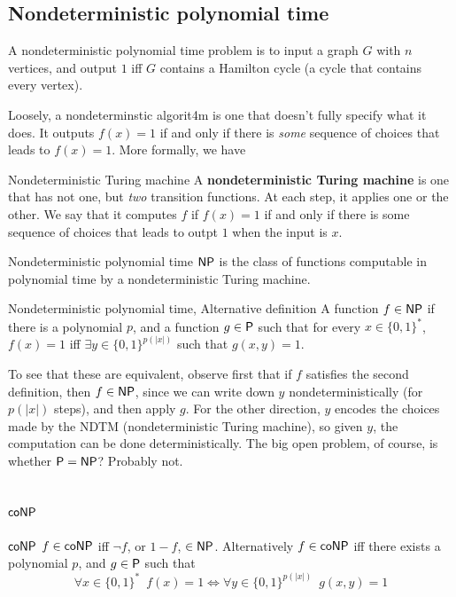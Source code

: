 \documentclass{article}
\begin{document}
\subsection{Nondeterministic polynomial time}
\begin{ex*}
    A nondeterministic polynomial time problem is to input a graph $G$ with $n$ vertices, and output $1$ iff $G$ contains a Hamilton cycle (a cycle that contains every vertex).
\end{ex*}
Loosely, a nondeterminstic algorit4m is one that doesn't fully specify what it does. It outputs $f(x)=1$ if and only if there is \textit{some} sequence of choices that leads to $f(x)=1$.\gap 
More formally, we have 
\begin{fancydefine}{Nondeterministic Turing machine}
    A \textbf{nondeterministic Turing machine} is one that has not one, but \textit{two} transition functions. At each step, it applies one or the other. \gap We say that it computes $f$ if $f(x)=1$ if and only if there is some sequence of choices that leads to outpt $1$ when the input is $x$.
\end{fancydefine}
\begin{fancydefine}{Nondeterministic polynomial time}
    $\mathsf{NP}$ is the class of functions computable in polynomial time by a nondeterministic Turing machine.
\end{fancydefine}
\begin{fancydefine*}{Nondeterministic polynomial time, Alternative definition}
    A function $f \in \mathsf{NP}$ if there is a polynomial $p$, and a function $g \in \mathsf{P}$ such that for every $x \in \{0,1\}^{*}$, $f(x)=1$ iff $\exists y \in \{0,1\}^{p(|x|)}$ such that $g(x,y)=1$.
\end{fancydefine*}
To see that these are equivalent, observe first that if $f$ satisfies the second definition, then $f \in \mathsf{NP}$, since we can write down $y$ nondeterministically (for $p(|x|)$ steps), and then apply $g$. \gap For the other direction, $y$ encodes the choices made by the NDTM (nondeterministic Turing machine), so given $y$, the computation can be done deterministically.\gap 
The big open problem, of course, is whether $\mathsf{P} = \mathsf{NP}$? Probably not.
\subsection{$\mathsf{coNP}$}
\begin{fancydefine}{$\mathsf{coNP}$}
    $f \in \mathsf{coNP}$ iff $\neg f$, or $1-f$, $\in \mathsf{NP}$. \gap Alternatively $f \in \mathsf{coNP}$ iff there exists a polynomial $p$, and $g \in \mathsf{P}$ such that \[ 
        \forall x \in \{0,1\}^{*} \,\,\, f(x) = 1 \Leftrightarrow \forall y \in \{0,1\}^{p(|x|)} \,\,\, g(x,y)=1
        \]

\end{fancydefine}
\end{document}
